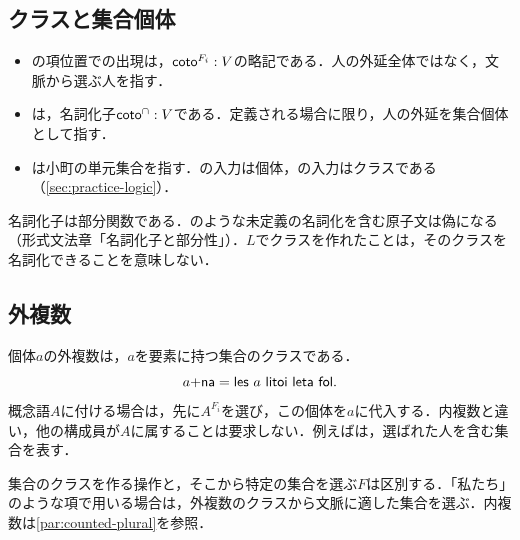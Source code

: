 \documentclass[../../main-detail.tex]{subfiles}
\begin{document}
\subsection{クラスと集合個体}
\begin{itemize}
 \item {}の項位置での出現は，$\textsf{coto}^{F_i}:V$の略記である．人の外延全体ではなく，文脈から選ぶ人を指す．
 \item {}は，名詞化子${{\textsf{coto}}^\cap}:V$である．定義される場合に限り，人の外延を集合個体として指す．
 \item {}は小町の単元集合を指す．の入力は個体，の入力はクラスである（\ref{sec:practice-logic}）．
\end{itemize}
\begin{remark}
名詞化子は部分関数である．のような未定義の名詞化を含む原子文は偽になる（形式文法章「名詞化子と部分性」）．$L$でクラスを作れたことは，そのクラスを名詞化できることを意味しない．
\end{remark}

\subsection{外複数}\label{subsec:practice-outerplural}
個体$a$の外複数は，$a$を要素に持つ集合のクラスである．
\[
 \textsf{$a$+na}=\textsf{les $a$ litoi leta fol}.
\]
概念語$A$に付ける場合は，先に$A^{F_i}$を選び，この個体を$a$に代入する．内複数と違い，他の構成員が$A$に属することは要求しない．例えばは，選ばれた人を含む集合を表す．
\begin{remark}
集合のクラスを作る操作と，そこから特定の集合を選ぶ$F$は区別する．「私たち」のような項で用いる場合は，外複数のクラスから文脈に適した集合を選ぶ．内複数は\ref{par:counted-plural}を参照．
\end{remark}
\end{document}
